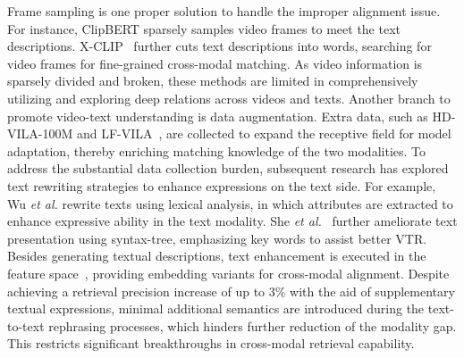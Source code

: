 Frame sampling is one proper solution to handle the improper alignment issue. For instance, ClipBERT \cite{lei2021less} sparsely samples video frames to meet the text descriptions. X-CLIP~\cite{ma2022x} further cuts text descriptions into words, searching for video frames for fine-grained cross-modal matching. As video information is sparsely divided and broken, these methods are limited in comprehensively utilizing and exploring deep relations across videos and texts. 
Another branch to promote video-text understanding is data augmentation. Extra data, such as HD-VILA-100M \cite{xue2022advancing} and LF-VILA~\cite{sun2022long-form}, are collected to expand the receptive field for model adaptation, thereby enriching matching knowledge of the two modalities.
To address the substantial data collection burden, subsequent research has explored text rewriting strategies to enhance expressions on the text side. For example, Wu \textit{et al.} \cite{wu2023bidirectional} rewrite texts using lexical analysis, in which attributes are extracted to enhance expressive ability in the text modality. She \textit{et al.}~\cite{yu2025she} further ameliorate text presentation using syntax-tree, emphasizing key words to assist better VTR. 
Besides generating textual descriptions, text enhancement is executed in the feature space~\cite{croitoru2021teachtext,wang2024text}, providing embedding variants for cross-modal alignment. 
Despite achieving a retrieval precision increase of up to 3\% with the aid of supplementary textual expressions, minimal additional semantics are introduced during the text-to-text rephrasing processes, which hinders further reduction of the modality gap. This restricts significant breakthroughs in cross-modal retrieval capability.


